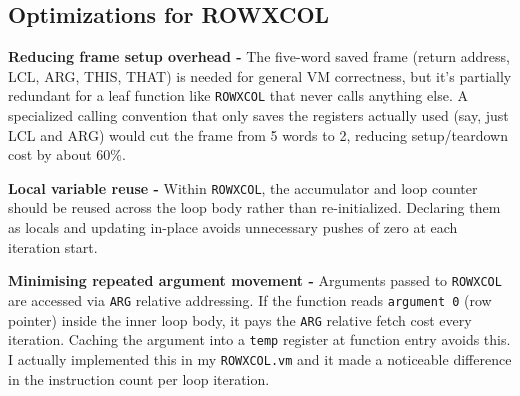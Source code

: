 \documentclass[12pt,a4paper]{article}
\begin{document}
\subsection{Optimizations for ROWXCOL}

\textbf{Reducing frame setup overhead -}
The five-word saved frame (return address, LCL, ARG, THIS, THAT) is needed for general VM correctness, but it's partially redundant for a leaf function like \texttt{ROWXCOL} that never calls anything else. A specialized calling convention that only saves the registers actually used (say, just LCL and ARG) would cut the frame from 5 words to 2, reducing setup/teardown cost by about 60\%.

\textbf{Local variable reuse -}
Within \texttt{ROWXCOL}, the accumulator and loop counter should be reused across the loop body rather than re-initialized. Declaring them as locals and updating in-place avoids unnecessary pushes of zero at each iteration start.

\textbf{Minimising repeated argument movement -}
Arguments passed to \texttt{ROWXCOL} are accessed via \texttt{ARG} relative addressing. If the function reads \texttt{argument 0} (row pointer) inside the inner loop body, it pays the \texttt{ARG} relative fetch cost every iteration. Caching the argument into a \texttt{temp} register at function entry avoids this. I actually implemented this in my \texttt{ROWXCOL.vm} and it made a noticeable difference in the instruction count per loop iteration.
\end{document}
